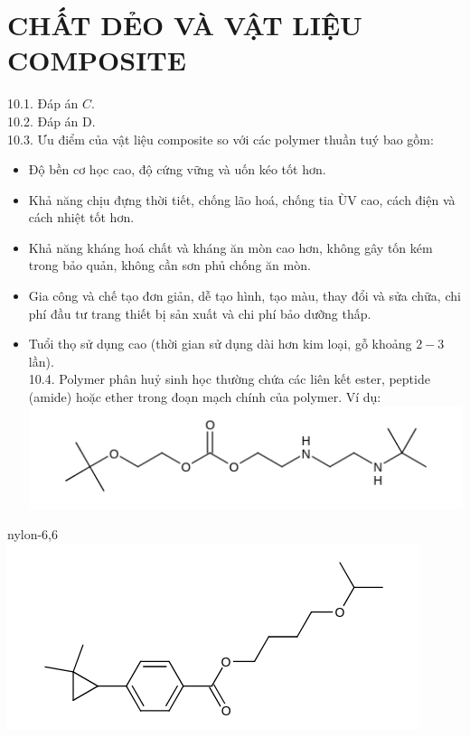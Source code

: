 \documentclass[10pt]{article}
\begin{document}
\section*{CHẤT DẺO VÀ VẬT LIỆU COMPOSITE}
10.1. Đáp án $C$.\\
10.2. Đáp án D.\\
10.3. Ưu điểm của vật liệu composite so với các polymer thuần tuý bao gồm:

\begin{itemize}
  \item Độ bền cơ học cao, độ cứng vững và uốn kéo tốt hơn.
  \item Khả năng chịu đựng thời tiết, chống lão hoá, chống tia ÙV cao, cách điện và cách nhiệt tốt hơn.
  \item Khả năng kháng hoá chất và kháng ăn mòn cao hơn, không gây tốn kém trong bảo quản, không cần sơn phủ chống ăn mòn.
  \item Gia công và chế tạo đơn giản, dễ tạo hình, tạo màu, thay đổi và sửa chữa, chi phí đầu tư trang thiết bị sản xuất và chi phí bảo dưỡng thấp.
  \item Tuổi thọ sử dụng cao (thời gian sử dụng dài hơn kim loại, gỗ khoảng $2-3$ lần).\\
10.4. Polymer phân huỷ sinh học thường chứa các liên kết ester, peptide (amide) hoặc ether trong đoạn mạch chính của polymer. Ví dụ:\\
\includegraphics{smile-a6e9b3a5579461baa228fa83a1bdd081b4417dbc}
\end{itemize}

nylon-6,6\\
\includegraphics{smile-6823a9051c75ffe4c004c1deb011041b083eac8a}
\end{document}
